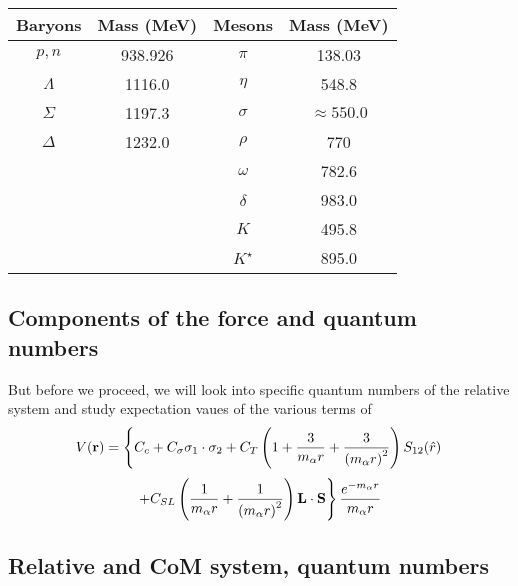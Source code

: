 \documentclass[graybox,sectrefs,envcountresetchap,open=right]{svmonodo}
\begin{document}
{\small   %

\vspace{4mm}

\begin{tabular}{cccc}
\hline
\multicolumn{1}{c}{ Baryons } & \multicolumn{1}{c}{ Mass (MeV) } & \multicolumn{1}{c}{ Mesons } & \multicolumn{1}{c}{ Mass (MeV) } \\
\hline
$p,n$     & 938.926    & $\pi$       & 138.03          \\
$\Lambda$ & 1116.0     & $\eta$      & 548.8           \\
$\Sigma$  & 1197.3     & $\sigma$    & $\approx 550.0$ \\
$\Delta$  & 1232.0     & $\rho$      & 770             \\
          &            & $\omega$    & 782.6           \\
          &            & $\delta$    & 983.0           \\
          &            & $K$         & 495.8           \\
          &            & $K^{\star}$ & 895.0           \\
\hline
\end{tabular}

\vspace{4mm}

}


\noindent




\subsection{Components of the force and quantum numbers}

But before we proceed, we will look into specific quantum numbers of the relative system and study 
expectation vaues of the various terms of
\[
V(\mathbf{r})= \left\{ C_c + C_\mathbf{\sigma} \mathbf{\sigma}_1\cdot\mathbf{\sigma}_2
 + C_T \left( 1 + {3\over m_\alpha r} + {3\over
\left(m_\alpha r\right)^2}\right) S_{12} (\hat r)\right. 
\]
\[
\left. + C_{SL} \left( {1\over m_\alpha r} + {1\over \left( m_\alpha r\right)^2}
\right) \mathbf{L}\cdot \mathbf{S}
\right\} \frac{e^{-m_\alpha r}}{m_\alpha r}
\]



\subsection{Relative and CoM system, quantum numbers}
\end{document}
